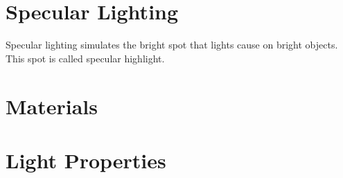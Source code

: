 \section{Specular Lighting}

Specular lighting simulates the bright spot that lights cause on bright objects.
This spot is called specular highlight.

\section{Materials}

\section{Light Properties}

